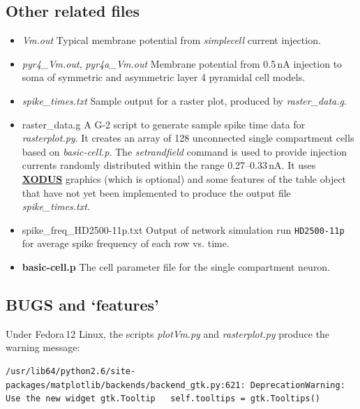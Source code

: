 \documentclass[12pt]{article}
\begin{document}
\subsection*{Other related files}

\begin{itemize}

\item {\it Vm.out} Typical membrane potential from {\it simplecell} current injection.

\item {{\it pyr4\_Vm.out}, {\it pyr4a\_Vm.out}} Membrane potential from 0.5\,nA injection to
soma of symmetric and asymmetric layer 4 pyramidal cell models.

\item {\it spike\_times.txt} Sample output for a raster plot, produced by {\it raster\_data.g}.

\item{raster\_data.g} A G-2 script to generate sample spike time data for
{\it rasterplot.py}. It creates an array of 128 unconnected single compartment
cells based on {\it basic-cell.p}.  The {\it setrandfield} command is used to provide
injection currents randomly distributed within the range 0.27--0.33\,nA.  It uses \href{http://www.genesis-sim.org/GENESIS/Hyperdoc/Manual-19.html}{\bf XODUS}
graphics (which is optional) and some features of the table object
that have not yet been implemented to produce the output file {\it spike\_times.txt}.

\item{spike\_freq\_HD2500-11p.txt} Output of network simulation run {\tt HD2500-11p}
    for average spike frequency of each row vs. time.

\item{\bf basic-cell.p} The cell parameter file for the single compartment neuron.

\end{itemize}

\subsection*{BUGS and `features'}

Under Fedora\,12 Linux, the scripts {\it plotVm.py} and {\it rasterplot.py} produce the
warning message:
\begin{verbatim}
/usr/lib64/python2.6/site-packages/matplotlib/backends/backend_gtk.py:621: DeprecationWarning: Use the new widget gtk.Tooltip   self.tooltips = gtk.Tooltips()
\end{verbatim}
\end{document}
